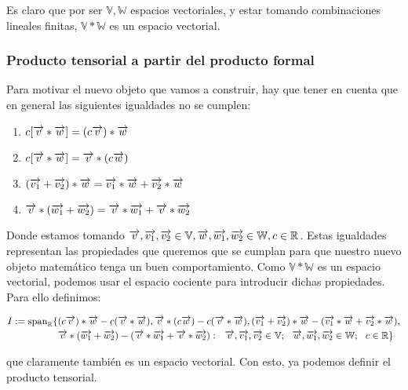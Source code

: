 Es claro que por ser $\mathbb{V}, \mathbb{W}$ espacios vectoriales, y estar tomando combinaciones lineales finitas, $\mathbb{V} \ast \mathbb{W}$ es un espacio vectorial.

\subsubsection{Producto tensorial a partir del producto formal} \label{sec:cociente_prod_formal}

Para motivar el nuevo objeto que vamos a construir, hay que tener en cuenta que en general las siguientes igualdades no se cumplen:

\begin{enumerate}
    \item $c [\overrightarrow{v} \ast \overrightarrow{w}] = (c\overrightarrow{v}) \ast \overrightarrow{w}$
    \item $c[\overrightarrow{v} \ast \overrightarrow{w}] = \overrightarrow{v} \ast (c\overrightarrow{w})$
    \item $(\overrightarrow{v_1} + \overrightarrow{v_2}) \ast \overrightarrow{w} = \overrightarrow{v_1} \ast \overrightarrow{w} + \overrightarrow{v_2} \ast \overrightarrow{w}$
    \item $\overrightarrow{v} \ast (\overrightarrow{w_1} + \overrightarrow{w_2}) = \overrightarrow{v} \ast \overrightarrow{w_1} + \overrightarrow{v} \ast \overrightarrow{w_2}$
\end{enumerate}

Donde estamos tomando $\overrightarrow{v}, \overrightarrow{v_1}, \overrightarrow{v_2} \in \mathbb{V}, \overrightarrow{w}, \overrightarrow{w_1}, \overrightarrow{w_2} \in \mathbb{W}, c \in \mathbb{R}$. Estas igualdades representan las propiedades que queremos que se cumplan para que nuestro nuevo objeto matemático tenga un buen comportamiento. Como $\mathbb{V} \ast \mathbb{W}$ es un espacio vectorial, podemos usar el espacio cociente para introducir dichas propiedades. Para ello definimos:

\begin{equation}
\begin{split}
    I := \text{span}_{\mathbb{R}} \{  &
        (c\overrightarrow{v}) \ast \overrightarrow{w} - c(\overrightarrow{v} \ast \overrightarrow{w}), \overrightarrow{v} \ast (c\overrightarrow{w}) - c(\overrightarrow{v} \ast \overrightarrow{w}), (\overrightarrow{v_1} + \overrightarrow{v_2}) \ast \overrightarrow{w} - (\overrightarrow{v_1} \ast \overrightarrow{w} + \overrightarrow{v_2} \ast \overrightarrow{w}), \\
        & \overrightarrow{v} \ast (\overrightarrow{w_1} + \overrightarrow{w_2}) - (\overrightarrow{v} \ast \overrightarrow{w_1} + \overrightarrow{v} \ast \overrightarrow{w_2}): \ \  \overrightarrow{v}, \overrightarrow{v_1}, \overrightarrow{v_2} \in \mathbb{V}; \ \  \overrightarrow{w}, \overrightarrow{w_1}, \overrightarrow{w_2} \in \mathbb{W}; \ \  c \in \mathbb{R}  \}
\end{split}
\end{equation}

que claramente también es un espacio vectorial. Con esto, ya podemos definir el producto tensorial.

